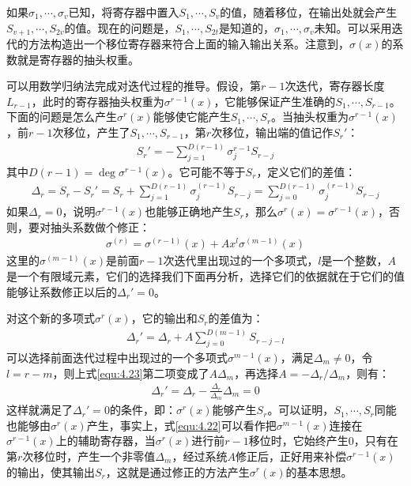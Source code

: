 如果$\sigma_1,\cdots ,\sigma_v$已知，将寄存器中置入$S_1,\cdots
,S_v$的值，随着移位，在输出处就会产生$S_{v+1},\cdots
,S_{2v}$的值。现在的问题是，$S_1,\cdots
,S_{2t}$是知道的，$\sigma_1,\cdots
,\sigma_v$未知。可以采用迭代的方法构造出一个移位寄存器来符合上面的输入输出关系。注意到，$\sigma(x)$的系数就是寄存器的抽头权重。

可以用数学归纳法完成对迭代过程的推导。假设，第$r-1$次迭代，寄存器长度$L_{r-1}$，此时的寄存器抽头权重为$\sigma^{r-1}(x)$，它能够保证产生准确的$S_1,\cdots
,S_{r-1}$。下面的问题是怎么产生$\sigma^r(x)$能够使它能产生$S_1,\cdots
,S_r$。当抽头权重为$\sigma^{r-1}(x)$，前$r-1$次移位，产生了$S_1,\cdots
,S_{r-1}$，第$r$次移位，输出端的值记作$S_r'$：
\begin{eqnarray}
S_r'=-\sum_{j=1}^{D(r-1)}\sigma_j^{r-1}S_{r-j}  
  \label{equ:4.20}
\end{eqnarray}
其中$D(r-1)=\deg\sigma^{r-1}(x)$。它可能不等于$S_r$，定义它们的差值：
\begin{eqnarray}
  \Delta_r=S_r-S_r'=S_r+\sum_{j=1}^{D(r-1)}\sigma_j^{(r-1)}S_{r-j}=\sum_{j=0}^{D(r-1)}\sigma_j^{(r-1)}S_{r-j}
  \label{equ:4.21}
\end{eqnarray}
如果$\Delta_r=0$，说明$\sigma^{r-1}(x)$也能够正确地产生$S_r$，那么$\sigma^r(x)=\sigma^{r-1}(x)$，否则，要对抽头系数做个修正：
\begin{eqnarray}
  \sigma^{(r)}=\sigma^{(r-1)}(x)+Ax^l\sigma^{(m-1)}(x)
  \label{equ:4.22}
\end{eqnarray}
这里的$\sigma^{(m-1)}(x)$是前面$r-1$次迭代里出现过的一个多项式，$l$是一个整数，$A$是一个有限域元素，它们的选择我们下面再分析，选择它们的依据就在于它们的值能够让系数修正以后的$\Delta_r'=0$。

对这个新的多项式$\sigma^r(x)$，它的输出和$S_r$的差值为：
\begin{eqnarray}
  \Delta_r'=\Delta_r+A\sum_{j=0}^{D(m-1)}S_{r-j-l}
  \label{equ:4.23}
\end{eqnarray}
可以选择前面迭代过程中出现过的一个多项式$\sigma^{m-1}(x)$，满足$\Delta_m\neq
0$，令$l=r-m$，则上式\ref{equ:4.23}第二项变成了$A\Delta_m$，再选择$A=-\Delta_r/\Delta_m$，则有：
\begin{eqnarray}
  \Delta_r'=\Delta_r-\frac{\Delta_r}{\Delta_m}\Delta_m=0
  \label{equ:4.24}
\end{eqnarray}
这样就满足了$\Delta_r'=0$的条件，即：$\sigma^r(x)$能够产生$S_r$。可以证明，$S_1,\cdots
,S_r$同能也能够由$\sigma^r(x)$产生，事实上，式\ref{equ:4.22}可以看作把$\sigma^{m-1}(x)$连接在$\sigma^{r-1}(x)$上的辅助寄存器，当$\sigma^r(x)$进行前$r-1$移位时，它始终产生0，只有在第$r$次移位时，产生一个非零值$\Delta_m$，经过系统$A$修正后，正好用来补偿$\sigma^{r-1}(x)$的输出，使其输出$S_r$，这就是通过修正的方法产生$\sigma^r(x)$的基本思想。

